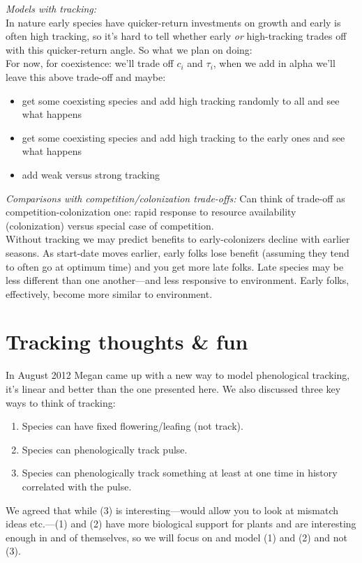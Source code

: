 \documentclass[11pt,a4paper,oneside]{article}
\begin{document}
\noindent \emph{Models with tracking:}\\
In nature early species have quicker-return investments on growth and early is often high tracking, so it's hard to tell whether early \emph{or} high-tracking trades off with this quicker-return angle. So what we plan on doing:\\
\noindent For now, for coexistence: we'll trade off \(c_{i}\) and \(\tau_{i}\), when we add in alpha we'll leave this above trade-off and maybe:
\begin{itemize}
\item get some coexisting species and add high tracking randomly to all and see what happens
\item get some coexisting species and add high tracking to the early ones and see what happens
\item add weak versus strong tracking
\end{itemize}

\noindent \emph{Comparisons with competition/colonization trade-offs:} Can think of trade-off as competition-colonization one: rapid response to resource availability (colonization) versus special case of competition.\\

Without tracking we may predict benefits to early-colonizers decline with earlier seasons. As start-date moves earlier, early folks lose benefit (assuming they tend to often go at optimum time) and you get more late folks. Late species may be less different than one another---and less responsive to environment. Early folks, effectively, become more similar to environment. 

\newpage
\section{Tracking thoughts \& fun}\label{trackingthoughs}
In August 2012 Megan came up with a new way to model phenological tracking, it's linear and better than the one presented here. We also discussed three key ways to think of tracking:
\begin{enumerate}
\item Species can have fixed flowering/leafing (not track).
\item Species can phenologically track pulse.
\item Species can phenologically track something at least at one time in history correlated with the pulse.
\end{enumerate}
We agreed that while (3) is interesting---would allow you to look at mismatch ideas etc.---(1) and (2) have more biological support for plants and are interesting enough in and of themselves, so we will focus on and model (1) and (2) and not (3).\\
\end{document}
